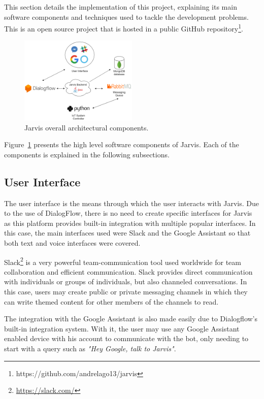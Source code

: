 \documentclass[runningheads]{llncs}
\begin{document}
This section details the implementation of this project, explaining its main software components and techniques used to tackle the development problems. This is an open source project that is hosted in a public GitHub repository\footnote{https://github.com/andrelago13/jarvis}.

\begin{figure}
    \begin{center}
        \includegraphics[width=0.5\textwidth]{figures/architecture.png}
        \caption{Jarvis overall architectural components.} \label{fig:architecture}
    \end{center}
\end{figure}

Figure~\ref{fig:architecture} presents the high level software components of Jarvis. Each of the components is explained in the following subsections.

\subsection{User Interface}

The user interface is the means through which the user interacts with Jarvis. Due to the use of DialogFlow, there is no need to create specific interfaces for Jarvis as this platform provides built-in integration with multiple popular interfaces. In this case, the main interfaces used were Slack and the Google Assistant so that both text and voice interfaces were covered.

Slack\footnote{\url{https://slack.com/}} is a very powerful team-communication tool used worldwide for team collaboration and efficient communication. Slack provides direct communication with individuals or groups of individuals, but also channeled conversations. In this case, users may create public or private messaging channels in which they can write themed content for other members of the channels to read.

The integration with the Google Assistant is also made easily due to Dialogflow's built-in integration system. With it, the user may use any Google Assistant enabled device with his account to communicate with the bot, only needing to start with a query such as \textit{"Hey Google, talk to Jarvis"}.
\end{document}
